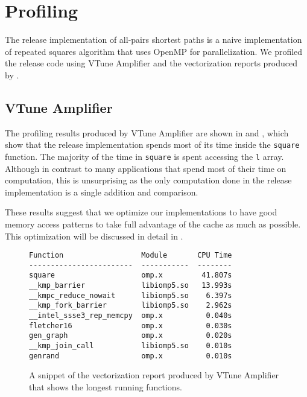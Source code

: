 \section{Profiling}\label{sec:profiling}
The release implementation of all-pairs shortest paths is a naive
implementation of repeated squares algorithm that uses OpenMP for
parallelization. We profiled the release code using VTune Amplifier and the
vectorization reports produced by \icc{}.

\subsection{VTune Amplifier}
The profiling results produced by VTune Amplifier are shown in 
and , which show that the release implementation spends
most of its time inside the \texttt{square} function. The majority of the time
in \texttt{square} is spent accessing the \texttt{l} array. Although in contrast
to many applications that spend most of their time on computation, this is
unsurprising as the only computation done in the release implementation is a
single addition and comparison.

These results suggest that we optimize our implementations to have good memory
access patterns to take full advantage of the cache as much as possible. This
optimization will be discussed in detail in .

\begin{figure}[h]
\centering
{
\begin{BVerbatim}
Function                  Module       CPU Time
------------------------  -----------  --------
square                    omp.x         41.807s
__kmp_barrier             libiomp5.so   13.993s
__kmpc_reduce_nowait      libiomp5.so    6.397s
__kmp_fork_barrier        libiomp5.so    2.962s
__intel_ssse3_rep_memcpy  omp.x          0.040s
fletcher16                omp.x          0.030s
gen_graph                 omp.x          0.020s
__kmp_join_call           libiomp5.so    0.010s
genrand                   omp.x          0.010s
\end{BVerbatim}
}
\caption{%
  A snippet of the vectorization report produced by VTune Amplifier that shows
  the longest running functions.
}
\label{fig:vtune-a}
\end{figure}

